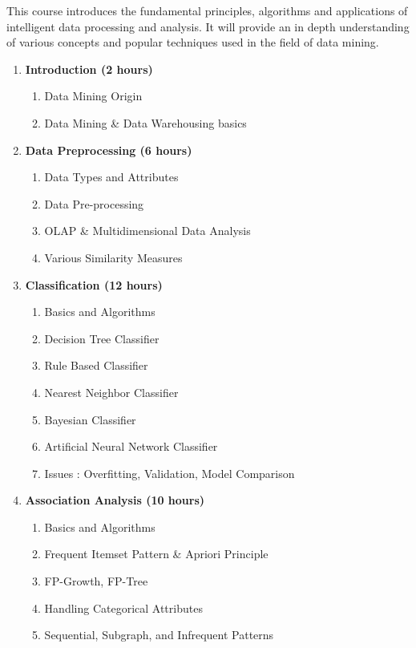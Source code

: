 
\cobjectives
  This course introduces the fundamental principles, algorithms and applications of intelligent data processing and analysis. It will provide an in depth understanding of various concepts and popular techniques used in the field of data mining.
  \VS

\begin{enumerate}
  \item \textbf{Introduction \hfill (2 hours)}
    \begin{enumerate}
      \item Data Mining Origin
      \item Data Mining \& Data Warehousing basics
    \end{enumerate}
    \vs

  \item \textbf{Data Preprocessing \hfill (6 hours)}
    \begin{enumerate}
      \item Data Types and Attributes
      \item Data Pre-processing
      \item OLAP \& Multidimensional Data Analysis
      \item Various Similarity Measures
    \end{enumerate}
    \vs

  \item \textbf{Classification \hfill (12 hours)}
    \begin{enumerate}
      \item Basics and Algorithms
      \item Decision Tree Classifier
      \item Rule Based Classifier
      \item Nearest Neighbor Classifier
      \item Bayesian Classifier
      \item Artificial Neural Network Classifier
      \item Issues : Overfitting, Validation, Model Comparison
    \end{enumerate}
    \vs

  \item \textbf{Association Analysis \hfill (10 hours)}
    \begin{enumerate}
      \item Basics and Algorithms
      \item Frequent Itemset Pattern \& Apriori Principle
      \item FP-Growth, FP-Tree
      \item Handling Categorical Attributes
      \item Sequential, Subgraph, and Infrequent Patterns
    \end{enumerate}
    \vs


\end{enumerate}
